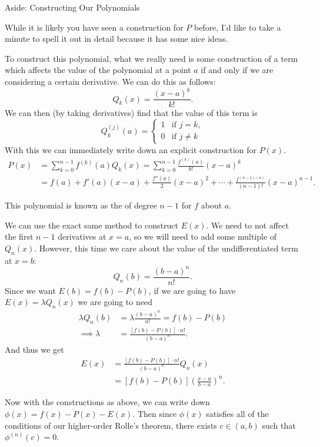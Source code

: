 \documentclass[a4paper]{scrartcl}
\begin{document}
\begin{aside}{Aside: Constructing Our Polynomials}

	While it is likely you have seen a construction for $P$ before, I'd like to take a minute to spell it out in detail because it has some nice ideas.

	To construct this polynomial, what we really need is some construction of a term which affects the value of the polynomial at a point $a$ if and only if we are considering a certain derivative. We can do this as follows:
	$$
		Q_{k}(x) = \frac{(x - a)^k}{k!}.
	$$
	We can then (by taking derivatives) find that the value of this term is
	$$
	Q_k^{(j)}(a) = \begin{cases}
        1 &\mbox{if } j = k, \\
        0 &\mbox{if } j \neq k
       \end{cases}
	$$
	With this we can immediately write down an explicit construction for $P(x)$.
	\begin{align*}
		P(x) &= \sum_{k = 0}^{n - 1} f^{(k)}(a) Q_k(x) = \sum_{k = 0}^{n - 1} \frac{f^{(k)}(a)}{k!}(x - a)^k \\
		&= f(a) + f'(a) (x - a) + \frac{f''(a)}{2} (x - a)^2 + \cdots + \frac{f^{(n - 1)(a)}}{(n - 1)!} (x - a)^{n - 1}.
	\end{align*}

	This polynomial is known as the  of degree $n - 1$ for $f$ about $a$. 

	We can use the exact same method to construct $E(x)$. 
	We need to not affect the first $n - 1$ derivatives at $x = a$, so we will need to add some multiple of $Q_{n}(x)$. However, this time we care about the value of the undifferentiated term at $x = b$:
	$$
	Q_{n}(b) = \frac{(b - a)^n}{n!}.
	$$
	Since we want $E(b) = f(b) - P(b)$, if we are going to have $E(x) = \lambda Q_n(x)$ we are going to need
	\begin{align*}
		\lambda Q_{n}(b) &= \lambda \frac{(b - a)^n}{n!} = f(b) - P(b) \\
\implies \lambda &= \frac{[f(b) - P(b)] \cdot n!}{(b - a)^n}.
	\end{align*}
	And thus we get
	\begin{align*}
		E(x) &= \frac{[f(b) - P(b)] \cdot n!}{(b - a)^n} Q_n(x) \\
		&= \left[f(b) - P(b)\right]\left(\frac{x - a}{b - a}\right)^n.
	\end{align*}
\end{aside}

Now with the constructions as above, we can write down $\phi(x) = f(x) - P(x) - E(x)$.
Then since $\phi(x)$ satisfies all of the conditions of our higher-order Rolle's theorem, there exists $c \in (a, b)$ such that $\phi^{(n)}(c) = 0$. 
\end{document}
